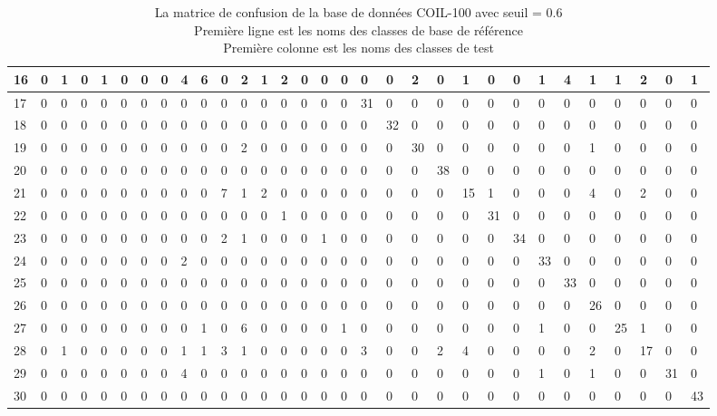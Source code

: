 \documentclass[french,12pt,a4paper,oneside,notitlepage]{report}
\begin{document}
\begin{table}[!ht]
\begin{center}
{\begin{tabular}{|l|l|l|l|l|l|l|l|l|l|l|l|l|l|l|l|l|l|l|l|l|l|l|l|l|l|l|l|l|l|l|}
\hline
16&0&1&0&1&0&0&0&4&6&0&2&1&2&0&0&0&0&0&2&0&1&0&0&1&4&1&1&2&0&1\\
\hline
17&0&0&0&0&0&0&0&0&0&0&0&0&0&0&0&0&31&0&0&0&0&0&0&0&0&0&0&0&0&0\\
\hline
18&0&0&0&0&0&0&0&0&0&0&0&0&0&0&0&0&0&32&0&0&0&0&0&0&0&0&0&0&0&0\\
\hline
19&0&0&0&0&0&0&0&0&0&0&2&0&0&0&0&0&0&0&30&0&0&0&0&0&0&1&0&0&0&0\\
\hline
20&0&0&0&0&0&0&0&0&0&0&0&0&0&0&0&0&0&0&0&38&0&0&0&0&0&0&0&0&0&0\\
\hline
21&0&0&0&0&0&0&0&0&0&7&1&2&0&0&0&0&0&0&0&0&15&1&0&0&0&4&0&2&0&0\\
\hline
22&0&0&0&0&0&0&0&0&0&0&0&0&1&0&0&0&0&0&0&0&0&31&0&0&0&0&0&0&0&0\\
\hline
23&0&0&0&0&0&0&0&0&0&2&1&0&0&0&1&0&0&0&0&0&0&0&34&0&0&0&0&0&0&0\\
\hline
24&0&0&0&0&0&0&0&2&0&0&0&0&0&0&0&0&0&0&0&0&0&0&0&33&0&0&0&0&0&0\\
\hline
25&0&0&0&0&0&0&0&0&0&0&0&0&0&0&0&0&0&0&0&0&0&0&0&0&33&0&0&0&0&0\\
\hline
26&0&0&0&0&0&0&0&0&0&0&0&0&0&0&0&0&0&0&0&0&0&0&0&0&0&26&0&0&0&0\\
\hline
27&0&0&0&0&0&0&0&0&1&0&6&0&0&0&0&1&0&0&0&0&0&0&0&1&0&0&25&1&0&0\\
\hline
28&0&1&0&0&0&0&0&1&1&3&1&0&0&0&0&0&3&0&0&2&4&0&0&0&0&2&0&17&0&0\\
\hline
29&0&0&0&0&0&0&0&4&0&0&0&0&0&0&0&0&0&0&0&0&0&0&0&1&0&1&0&0&31&0\\
\hline
30&0&0&0&0&0&0&0&0&0&0&0&0&0&0&0&0&0&0&0&0&0&0&0&0&0&0&0&0&0&43\\
\hline
	    \end{tabular}
	}
	\end{center}
	\caption {La matrice de confusion de la base de données COIL-100 avec seuil = 0.6\\
	\hspace*{1.7cm}  Première ligne est les noms des classes de base de référence\\
	\hspace*{1.7cm}  Première colonne est les noms des classes de test}
\end{table}
\clearpage
\end{document}
